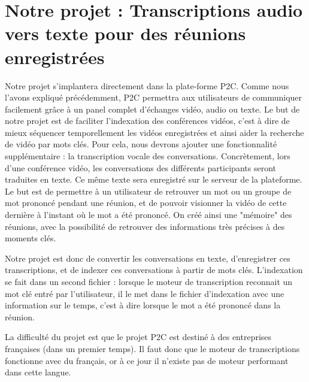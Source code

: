 

\section{Notre projet : Transcriptions audio vers texte pour des réunions enregistrées}
	Notre projet s'implantera directement dans la plate-forme P2C. Comme nous l'avons expliqué précédemment, P2C permettra aux utilisateurs de communiquer facilement grâce à un panel complet d'échanges vidéo, audio ou texte. Le but de notre projet est de faciliter l'indexation des conférences vidéos, c'est à dire de mieux séquencer temporellement les vidéos enregistrées et ainsi aider la recherche de vidéo par mots clés. Pour cela, nous devrons ajouter une fonctionnalité supplémentaire : la transcription vocale des conversations. Concrètement, lors d'une conférence vidéo, les conversations des différents participants seront traduites en texte. Ce même texte sera enregistré sur le serveur de la plateforme. Le but est de permettre à un utilisateur de retrouver un mot ou un groupe de mot prononcé pendant une réunion, et de pouvoir visionner la vidéo de cette dernière à l'instant où le mot a été prononcé. On créé ainsi une "mémoire" des réunions, avec la possibilité de retrouver des informations très précises à des moments clés. 
	
	
	Notre projet est donc de convertir les conversations en texte, d'enregistrer ces transcriptions, et de indexer ces conversations à partir de mots clés. L'indexation se fait dans un second fichier : lorsque le moteur de transcription reconnait un mot clé entré par l'utilisateur, il le met dans le fichier d'indexation avec une information sur le temps, c'est à dire lorsque le mot a été prononcé dans la réunion.
	
	
	La difficulté du projet est que le projet P2C est destiné à des entreprises françaises (dans un premier temps). Il faut donc que le moteur de transcriptions fonctionne avec du français, or à ce jour il n'existe pas de moteur performant dans cette langue.